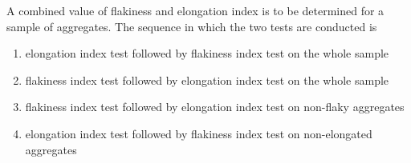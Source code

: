 \item A combined value of flakiness and elongation index is to be determined for a sample of aggregates. The sequence in which the two tests are conducted is

\begin{enumerate}
	\item elongation index test followed by flakiness index test on the whole sample
	\item flakiness index test followed by elongation index test on the whole sample
	\item flakiness index test followed by elongation index test on non-flaky aggregates
	\item elongation index test followed by flakiness index test on non-elongated aggregates
\end{enumerate}

